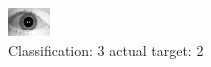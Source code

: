 \begin{figure}[h!]
\begin{center}
\includegraphics[width=0.60\columnwidth]{figures/ID1754_class_3_target_2.png}
\end{center}
\caption{ Classification: 3 actual target: 2}
\label{fig:ID1754_class_3_target_2}
\end{figure}

